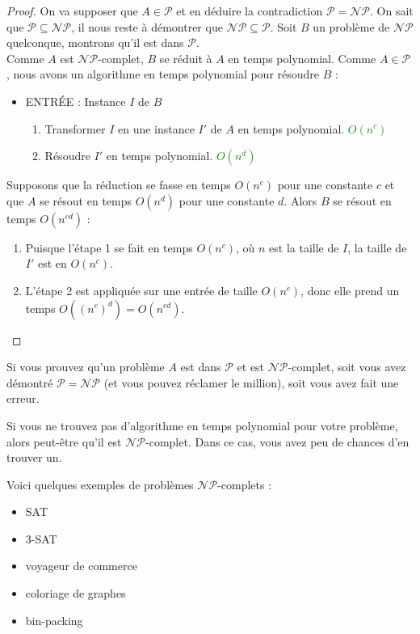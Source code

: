 \begin{proof}
    On va supposer que $A\in\mathcal{P}$ et en déduire la contradiction $\mathcal{P}=\mathcal{NP}$. On sait que $\mathcal{P}
    \subseteq\mathcal{NP}$, il nous reste à démontrer que $\mathcal{NP}\subseteq\mathcal{P}$. Soit $B$ un problème de 
    $\mathcal{NP}$ quelconque, montrons qu'il est dans $\mathcal{P}$. \\
    Comme $A$ est $\mathcal{NP}$-complet, $B$ se réduit à $A$ en temps polynomial. Comme $A\in\mathcal{P}$, nous avons un 
    algorithme en temps polynomial pour résoudre $B$ :
    \begin{itemize}[label=\textbullet]
        \item ENTRÉE : Instance $I$ de $B$
        \begin{enumerate}
            \item Transformer $I$ en une instance $I'$ de $A$ en temps polynomial. \textcolor{green}{$O(n^c)$}
            \item Résoudre $I'$ en temps polynomial. \textcolor{green}{$O(n^d)$}
        \end{enumerate}
    \end{itemize}
    Supposons que la réduction se fasse en temps $O(n^c)$ pour une constante $c$ et que $A$ se résout en temps $O(n^d)$ pour
    une constante $d$. Alors $B$ se résout en temps $O(n^{cd})$ :
    \begin{enumerate}
        \item Puisque l'étape 1 se fait en temps $O(n^c)$, où $n$ est la taille de $I$, la taille de $I'$ est en $O(n^c)$.
        \item L'étape 2 est appliquée sur une entrée de taille $O(n^c)$, donc elle prend un temps $O((n^c)^d) = O(n^{cd})$.
    \end{enumerate}
\end{proof}
\begin{lemma}{}{}
    Si vous prouvez qu'un problème $A$ est dans $\mathcal{P}$ et est $\mathcal{NP}$-complet, soit vous avez démontré 
    $\mathcal{P}=\mathcal{NP}$ (et vous pouvez réclamer le million), soit vous avez fait une erreur.
\end{lemma}
\begin{lemma}{}{}
    Si vous ne trouvez pas d'algorithme en temps polynomial pour votre problème, alors peut-être qu'il est $\mathcal{NP}$-complet.
    Dans ce cas, vous avez peu de chances d'en trouver un.
\end{lemma}
\begin{example}
    Voici quelques exemples de problèmes $\mathcal{NP}$-complets :
    \begin{itemize}[label=\textbullet]
        \item SAT
        \item 3-SAT
        \item voyageur de commerce
        \item coloriage de graphes
        \item bin-packing
    \end{itemize}
\end{example}

